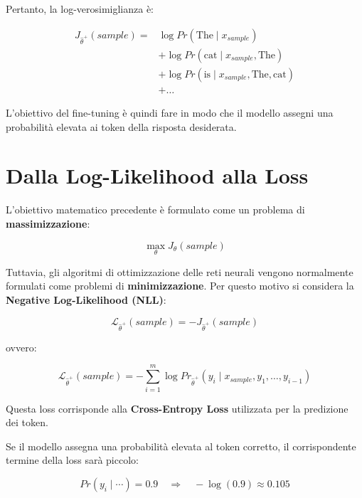 Pertanto, la log-verosimiglianza è:

\begin{align}
J_{\hat{\theta}^+}(sample)
={}&
\log Pr(\text{The}\mid x_{sample})
\\
&+
\log Pr(\text{cat}\mid x_{sample},\text{The})
\\
&+
\log Pr(\text{is}\mid x_{sample},\text{The},\text{cat})
\\
&+\dots
\end{align}

L'obiettivo del fine-tuning è quindi fare in modo che il modello
assegni una probabilità elevata ai token della risposta desiderata.

\section*{Dalla Log-Likelihood alla Loss}

L'obiettivo matematico precedente è formulato come un problema di
\textbf{massimizzazione}:

\begin{equation}
\max_{\theta} J_\theta(sample)
\end{equation}

Tuttavia, gli algoritmi di ottimizzazione delle reti neurali vengono
normalmente formulati come problemi di \textbf{minimizzazione}. Per
questo motivo si considera la \textbf{Negative Log-Likelihood (NLL)}:

\begin{equation}
\boxed{
\mathcal{L}_{\hat{\theta}^+}(sample)
=
-
J_{\hat{\theta}^+}(sample)
}
\end{equation}

ovvero:

\begin{equation}
\boxed{
\mathcal{L}_{\hat{\theta}^+}(sample)
=
-
\sum_{i=1}^{m}
\log
Pr_{\hat{\theta}^+}
\left(
y_i
\mid
x_{sample},y_1,\dots,y_{i-1}
\right)
}
\end{equation}

Questa loss corrisponde alla \textbf{Cross-Entropy Loss} utilizzata
per la predizione dei token.

Se il modello assegna una probabilità elevata al token corretto, il
corrispondente termine della loss sarà piccolo:

\begin{equation}
Pr(y_i\mid\cdots)=0.9
\quad\Longrightarrow\quad
-\log(0.9)\approx0.105
\end{equation}

